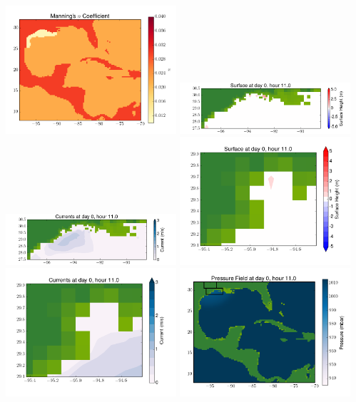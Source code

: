 \documentclass[11pt]{article}
\begin{document}
\vskip 10pt 
\includegraphics[width=0.475\textwidth]{frame0083fig3.png}
\includegraphics[width=0.475\textwidth]{frame0083fig4.png}
\vskip 10pt 
\includegraphics[width=0.475\textwidth]{frame0083fig5.png}
\includegraphics[width=0.475\textwidth]{frame0083fig6.png}
\vskip 10pt 
\includegraphics[width=0.475\textwidth]{frame0083fig7.png}
\includegraphics[width=0.475\textwidth]{frame0083fig8.png}
\end{document}
